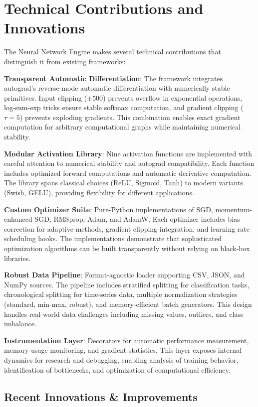 \documentclass[11pt,a4paper]{report}
\begin{document}
\section{Technical Contributions and Innovations}

The Neural Network Engine makes several technical contributions that distinguish it from existing frameworks:

\textbf{Transparent Automatic Differentiation}: The framework integrates autograd's reverse-mode automatic differentiation with numerically stable primitives. Input clipping ($\pm500$) prevents overflow in exponential operations, log-sum-exp tricks ensure stable softmax computation, and gradient clipping ($\tau=5$) prevents exploding gradients. This combination enables exact gradient computation for arbitrary computational graphs while maintaining numerical stability.

\textbf{Modular Activation Library}: Nine activation functions are implemented with careful attention to numerical stability and autograd compatibility. Each function includes optimized forward computations and automatic derivative computation. The library spans classical choices (ReLU, Sigmoid, Tanh) to modern variants (Swish, GELU), providing flexibility for different applications.

\textbf{Custom Optimizer Suite}: Pure-Python implementations of SGD, momentum-enhanced SGD, RMSprop, Adam, and AdamW. Each optimizer includes bias correction for adaptive methods, gradient clipping integration, and learning rate scheduling hooks. The implementations demonstrate that sophisticated optimization algorithms can be built transparently without relying on black-box libraries.

\textbf{Robust Data Pipeline}: Format-agnostic loader supporting CSV, JSON, and NumPy sources. The pipeline includes stratified splitting for classification tasks, chronological splitting for time-series data, multiple normalization strategies (standard, min-max, robust), and memory-efficient batch generators. This design handles real-world data challenges including missing values, outliers, and class imbalance.

\textbf{Instrumentation Layer}: Decorators for automatic performance measurement, memory usage monitoring, and gradient statistics. This layer exposes internal dynamics for research and debugging, enabling analysis of training behavior, identification of bottlenecks, and optimization of computational efficiency.

\subsection{Recent Innovations \& Improvements}
\end{document}
